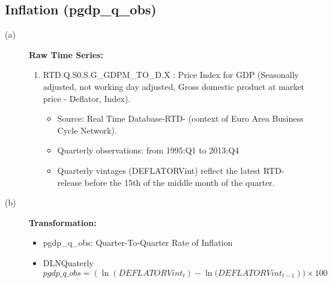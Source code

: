 \documentclass[3p,review,times]{elsarticle}		%
\begin{document}
\subsection{Inflation (pgdp\_q\_obs)}
\begin{description}
	\item[(a)] \textbf{Raw Time Series:} 
	\begin{enumerate}
		\item RTD.Q.S0.S.G\_GDPM\_TO\_D.X : Price Index for GDP (Seasonally adjusted, not working day adjusted, Gross domestic product at market price - Deflator, Index). 
		\begin{itemize}
			\item Source: Real Time Database-RTD- (context of Euro Area Business Cycle Network). 
			\item Quarterly observations: from 1995:Q1 to 2013:Q4
			\item Quarterly vintages (DEFLATORVint) reflect the latest RTD-release before the 15th of the middle month of the quarter. 
		\end{itemize} 
	\end{enumerate}
	\item[(b)] \textbf{Transformation:}
	\begin{itemize}
		\item pgdp\_q\_obs: Quarter-To-Quarter Rate of Inflation
		\item DLNQuaterly
		$$pgdp\_q\_obs=\left(\ln(DEFLATORVint_t)-\ln(DEFLATORVint_{t-1}\right))\times 100$$
	\end{itemize}
\end{description}
\end{document}

